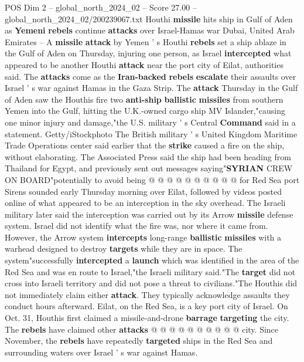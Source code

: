 \begin{textsample}{POS Dim 2 – global\_north\_2024\_02 – Score 27.00 – global\_north\_2024\_02/200239067.txt}  \label{ex:f2_pos_263}
Houthi \textbf{missile} hits ship in Gulf of Aden as \textbf{Yemeni} \textbf{rebels} continue \textbf{attacks} over Israel-Hamas war Dubai, United Arab Emirates -- A \textbf{missile} \textbf{attack} by Yemen ' s Houthi \textbf{rebels} set a ship ablaze in the Gulf of Aden on Thursday, injuring one person, as Israel \textbf{intercepted} what appeared to be another Houthi \textbf{attack} near the port city of Eilat, authorities said.
The \textbf{attacks} come as the \textbf{Iran-backed} \textbf{rebels} \textbf{escalate} their assaults over Israel ' s war against Hamas in the Gaza Strip.
The \textbf{attack} Thursday in the Gulf of Aden saw the Houthis fire two \textbf{anti-ship} \textbf{ballistic} \textbf{missiles} from southern Yemen into the Gulf, hitting the U.K.-owned cargo ship MV Islander,"causing one minor injury and damage,"the U.S. military ' s Central \textbf{Command} said in a statement.
Getty/iStockphoto The British military ' s United Kingdom Maritime Trade Operations center said earlier that the \textbf{strike} caused a fire on the ship, without elaborating.
The Associated Press said the ship had been heading from Thailand for Egypt, and previously sent out messages saying"\textbf{SYRIAN} CREW ON BOARD"potentially to avoid being @ @ @ @ @ @ @ @ @ @ for Red Sea port Sirens sounded early Thursday morning over Eilat, followed by videos posted online of what appeared to be an interception in the sky overhead.
The Israeli military later said the interception was carried out by its Arrow \textbf{missile} defense system.
Israel did not identify what the fire was, nor where it came from.
However, the Arrow system \textbf{intercepts} long-range \textbf{ballistic} \textbf{missiles} with a warhead designed to destroy \textbf{targets} while they are in space.
The system"successfully \textbf{intercepted} a \textbf{launch} which was identified in the area of the Red Sea and was en route to Israel,"the Israeli military said."The \textbf{target} did not cross into Israeli territory and did not pose a threat to civilians."The Houthis did not immediately claim either \textbf{attack}.
They typically acknowledge assaults they conduct hours afterward.
Eilat, on the Red Sea, is a key port city of Israel.
On Oct. 31, Houthis first claimed a missile-and-drone \textbf{barrage} \textbf{targeting} the city.
The \textbf{rebels} have claimed other \textbf{attacks} @ @ @ @ @ @ @ @ @ @ city.
Since November, the \textbf{rebels} have repeatedly \textbf{targeted} ships in the Red Sea and surrounding waters over Israel ' s war against Hamas.

\end{textsample}
